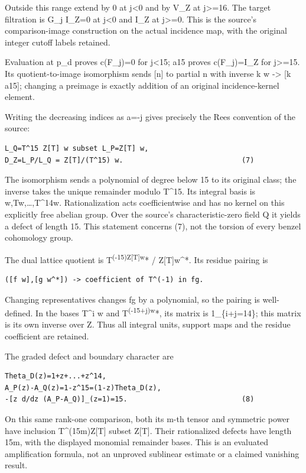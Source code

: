 \documentclass[
  10pt,
]{scrreprt}
\begin{document}
Outside this range extend by 0 at j\textless0 and by V\_Z at
j\textgreater=16. The target filtration is G\_j I\_Z=0 at j\textless0
and I\_Z at j\textgreater=0. This is the source's comparison-image
construction on the actual incidence map, with the original integer
cutoff labels retained.

Evaluation at p\_d proves c(F\_j)=0 for j\textless15; a15 proves
c(F\_j)=I\_Z for j\textgreater=15. Its quotient-to-image isomorphism
sends {[}n{]} to partial n with inverse k w -\textgreater{} {[}k a15{]};
changing a preimage is exactly addition of an original incidence-kernel
element.

Writing the decreasing indices as a=-j gives precisely the Rees
convention of the source:

\begin{verbatim}
L_Q=T^15 Z[T] w subset L_P=Z[T] w,
D_Z=L_P/L_Q = Z[T]/(T^15) w.                            (7)
\end{verbatim}

The isomorphism sends a polynomial of degree below 15 to its original
class; the inverse takes the unique remainder modulo T\^{}15. Its
integral basis is w,Tw,\ldots,T\^{}14w. Rationalization acts
coefficientwise and has no kernel on this explicitly free abelian group.
Over the source's characteristic-zero field Q it yields a defect of
length 15. This statement concerns (7), not the torsion of every benzel
cohomology group.

The dual lattice quotient is T\textsuperscript{(-15)Z{[}T{]}w}* /
Z{[}T{]}w\^{}*. Its residue pairing is

\begin{verbatim}
([f w],[g w^*]) -> coefficient of T^(-1) in fg.
\end{verbatim}

Changing representatives changes fg by a polynomial, so the pairing is
well-defined. In the bases T\^{}i w and T\textsuperscript{(-15+j)w}*,
its matrix is 1\_\{i+j=14\}; this matrix is its own inverse over Z. Thus
all integral units, support maps and the residue coefficient are
retained.

The graded defect and boundary character are

\begin{verbatim}
Theta_D(z)=1+z+...+z^14,
A_P(z)-A_Q(z)=1-z^15=(1-z)Theta_D(z),
-[z d/dz (A_P-A_Q)]_(z=1)=15.                           (8)
\end{verbatim}

On this same rank-one comparison, both its m-th tensor and symmetric
power have inclusion T\^{}(15m)Z{[}T{]} subset Z{[}T{]}. Their
rationalized defects have length 15m, with the displayed monomial
remainder bases. This is an evaluated amplification formula, not an
unproved sublinear estimate or a claimed vanishing result.
\end{document}
